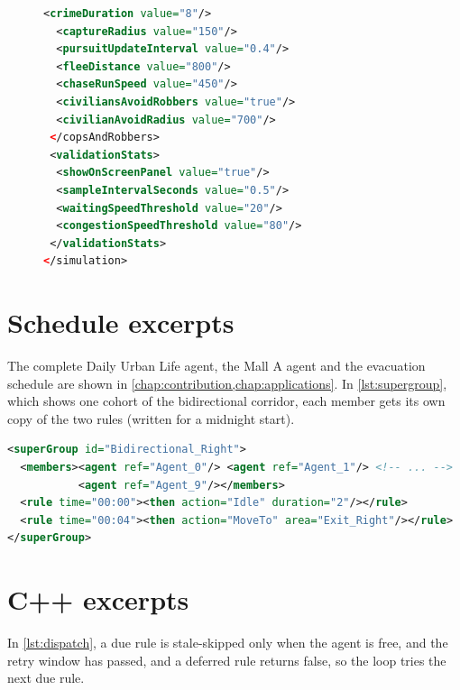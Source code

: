 \begin{figure}[H]
\begin{minipage}{\textwidth}
\begin{minipage}[t]{0.54\textwidth}
\begin{lstlisting}[language=XML,style=cfglst]
  <crimeDuration value="8"/>
  <captureRadius value="150"/>
  <pursuitUpdateInterval value="0.4"/>
  <fleeDistance value="800"/>
  <chaseRunSpeed value="450"/>
  <civiliansAvoidRobbers value="true"/>
  <civilianAvoidRadius value="700"/>
 </copsAndRobbers>
 <validationStats>
  <showOnScreenPanel value="true"/>
  <sampleIntervalSeconds value="0.5"/>
  <waitingSpeedThreshold value="20"/>
  <congestionSpeedThreshold value="80"/>
 </validationStats>
</simulation>
\end{lstlisting}
\end{minipage}
\label{lst:config}
\end{minipage}
\end{figure}

\section{Schedule excerpts}\label{app:listings-schedules}

The complete Daily Urban Life agent, the Mall A agent and the evacuation schedule are shown in \cref{chap:contribution,chap:applications}. In \cref{lst:supergroup}, which shows one cohort of the bidirectional corridor, each member gets its own copy of the two rules (written for a midnight start).

\noindent\begin{minipage}{\linewidth}
\begin{lstlisting}[language=XML,style=applst,caption={Validation cohort (\texttt{Validation/Validation\_Bidirectional.xml}), members 2 to 8 omitted.},label={lst:supergroup}]
<superGroup id="Bidirectional_Right">
  <members><agent ref="Agent_0"/> <agent ref="Agent_1"/> <!-- ... -->
           <agent ref="Agent_9"/></members>
  <rule time="00:00"><then action="Idle" duration="2"/></rule>
  <rule time="00:04"><then action="MoveTo" area="Exit_Right"/></rule>
</superGroup>
\end{lstlisting}
\end{minipage}

\section{C++ excerpts}\label{app:listings-code}

In \cref{lst:dispatch}, a due rule is stale-skipped only when the agent is free, and the retry window has passed, and a deferred rule returns false, so the loop tries the next due rule.

